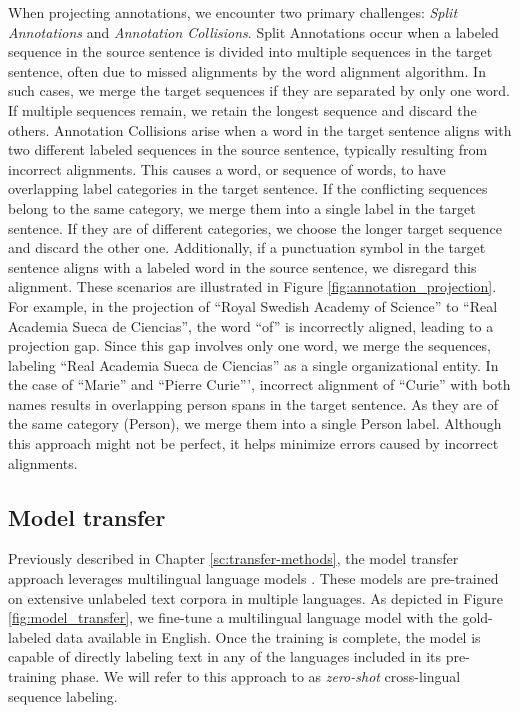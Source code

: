 When projecting annotations, we encounter two primary challenges: \textit{Split Annotations} and \textit{Annotation Collisions}. Split Annotations occur when a labeled sequence in the source sentence is divided into multiple sequences in the target sentence, often due to missed alignments by the word alignment algorithm. In such cases, we merge the target sequences if they are separated by only one word. If multiple sequences remain, we retain the longest sequence and discard the others. Annotation Collisions arise when a word in the target sentence aligns with two different labeled sequences in the source sentence, typically resulting from incorrect alignments. This causes a word, or sequence of words, to have overlapping label categories in the target sentence. If the conflicting sequences belong to the same category, we merge them into a single label in the target sentence. If they are of different categories, we choose the longer target sequence and discard the other one. Additionally, if a punctuation symbol in the target sentence aligns with a labeled word in the source sentence, we disregard this alignment. These scenarios are illustrated in Figure \ref{fig:annotation_projection}. For example, in the projection of ``Royal Swedish Academy of Science'' to ``Real Academia Sueca de Ciencias'', the word ``of'' is incorrectly aligned, leading to a projection gap. Since this gap involves only one word, we merge the sequences, labeling ``Real Academia Sueca de Ciencias'' as a single organizational entity. In the case of ``Marie'' and ``Pierre Curie''', incorrect alignment of ``Curie'' with both names results in overlapping person spans in the target sentence. As they are of the same category (Person), we merge them into a single Person label. Although this approach might not be perfect, it helps minimize errors caused by incorrect alignments.




\subsection{Model transfer}

Previously described in Chapter \ref{sc:transfer-methods}, the model transfer approach leverages multilingual language models \cite{devlin-etal-2019-bert, conneau-etal-2020-unsupervised}. These models are pre-trained on extensive unlabeled text corpora in multiple languages. As depicted in Figure \ref{fig:model_transfer}, we fine-tune a multilingual language model with the gold-labeled data available in English. Once the training is complete, the model is capable of directly labeling text in any of the languages included in its pre-training phase. We will refer to this approach to as \textit{zero-shot} cross-lingual sequence labeling.

